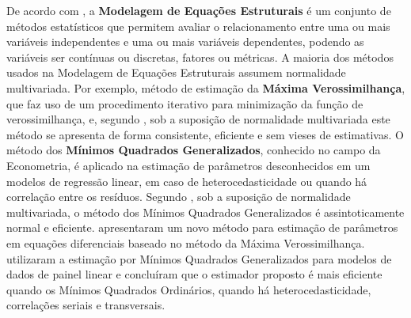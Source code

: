 De acordo com \textcite{Ullman2013}, a \textbf{Modelagem de Equações Estruturais} é um conjunto de métodos estatísticos que permitem avaliar o relacionamento entre uma ou mais variáveis independentes e uma ou mais variáveis dependentes, podendo as variáveis ser contínuas ou discretas, fatores ou métricas. A maioria dos métodos usados na Modelagem de Equações Estruturais assumem normalidade multivariada. Por exemplo, método de estimação da \textbf{Máxima Verossimilhança}, que faz uso de um procedimento iterativo para minimização da função de verossimilhança, e, segundo \textcite{Anderson1982}, sob a suposição de normalidade multivariada este método se apresenta de forma consistente, eficiente e sem vieses de estimativas. O método dos \textbf{Mínimos Quadrados Generalizados}, conhecido no campo da Econometria, é aplicado na estimação de parâmetros desconhecidos em um modelos de regressão linear, em caso de heterocedasticidade ou quando há correlação entre os resíduos. Segundo \textcite{Amorim2012}, sob a suposição de normalidade multivariada, o método dos Mínimos Quadrados Generalizados é assintoticamente normal e eficiente. \textcite{Liu2022} apresentaram um novo método para estimação de parâmetros em equações diferenciais baseado no método da Máxima Verossimilhança. \textcite{Bai2020} utilizaram a estimação por Mínimos Quadrados Generalizados para modelos de dados de painel linear e concluíram que o estimador proposto é mais eficiente quando os Mínimos Quadrados Ordinários, quando há heterocedasticidade, correlações seriais e transversais.








